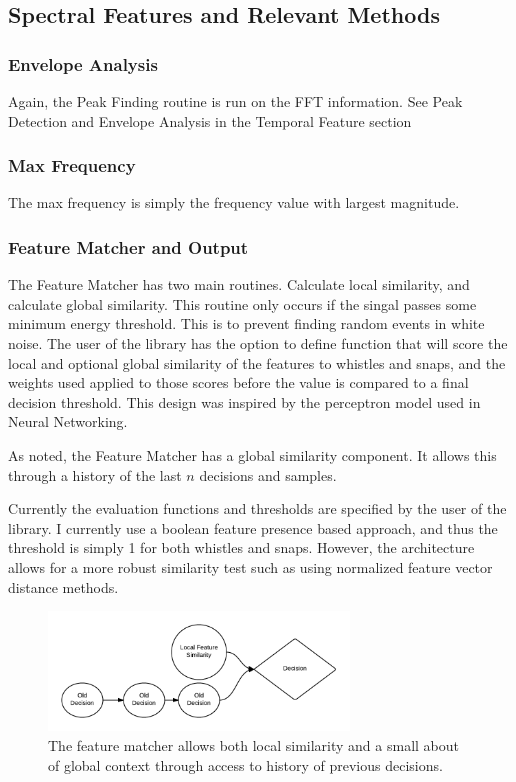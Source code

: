 \documentclass[DIV=calc, paper=a4, fontsize=11pt, twocolumn]{scrartcl}   %
\begin{document}
\subsection{Spectral Features and Relevant Methods}
   \subsubsection{Envelope Analysis}
   Again, the Peak Finding routine is run on the FFT information. See Peak Detection and Envelope Analysis in the Temporal Feature section
   \subsubsection{Max Frequency}
   The max frequency is simply the frequency value with largest magnitude.



\subsubsection{Feature Matcher and Output}
The Feature Matcher has two main routines. Calculate local similarity, and calculate global similarity. This routine only occurs if the singal passes some minimum energy threshold. This is to prevent finding random events in white noise. The user of the library has the option to define function that will score the local and optional global similarity of the features to whistles and snaps, and the weights used applied to those scores before the value is compared to a final decision threshold. This design was inspired by the perceptron model used in Neural Networking.
\par As noted, the Feature Matcher has a global similarity component. It allows this through a history of the last $n$ decisions and samples.
\par Currently the evaluation functions and thresholds are specified by the user of the library. I currently use a boolean feature presence based approach, and thus the threshold is simply 1 for both whistles and snaps. However, the architecture allows for a more robust similarity test such as using normalized feature vector distance methods.

\begin{figure}[h]
   \centering
   \includegraphics[width=80mm]{figures/FeatureMatcherFuture.png}
   \caption{The feature matcher allows both local similarity and a small about of global context through access to history of previous decisions.}
   \label{overflow}
\end{figure}
\end{document}
